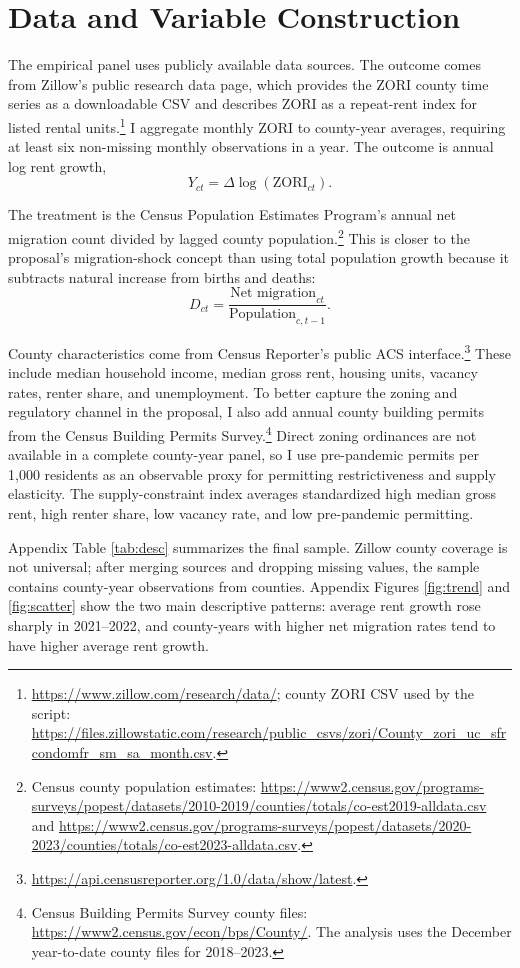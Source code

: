 \documentclass[11pt]{article}
\begin{document}
\section{Data and Variable Construction}

The empirical panel uses publicly available data sources. The outcome comes from Zillow's public research data page, which provides the ZORI county time series as a downloadable CSV and describes ZORI as a repeat-rent index for listed rental units.\footnote{\url{https://www.zillow.com/research/data/}; county ZORI CSV used by the script: \url{https://files.zillowstatic.com/research/public_csvs/zori/County_zori_uc_sfrcondomfr_sm_sa_month.csv}.} I aggregate monthly ZORI to county-year averages, requiring at least six non-missing monthly observations in a year. The outcome is annual log rent growth,
\[
Y_{ct}=\Delta \log(\text{ZORI}_{ct}).
\]

The treatment is the Census Population Estimates Program's annual net migration count divided by lagged county population.\footnote{Census county population estimates: \url{https://www2.census.gov/programs-surveys/popest/datasets/2010-2019/counties/totals/co-est2019-alldata.csv} and \url{https://www2.census.gov/programs-surveys/popest/datasets/2020-2023/counties/totals/co-est2023-alldata.csv}.} This is closer to the proposal's migration-shock concept than using total population growth because it subtracts natural increase from births and deaths:
\[
D_{ct}=\frac{\text{Net migration}_{ct}}{\text{Population}_{c,t-1}}.
\]

County characteristics come from Census Reporter's public ACS interface.\footnote{\url{https://api.censusreporter.org/1.0/data/show/latest}.} These include median household income, median gross rent, housing units, vacancy rates, renter share, and unemployment. To better capture the zoning and regulatory channel in the proposal, I also add annual county building permits from the Census Building Permits Survey.\footnote{Census Building Permits Survey county files: \url{https://www2.census.gov/econ/bps/County/}. The analysis uses the December year-to-date county files for 2018--2023.} Direct zoning ordinances are not available in a complete county-year panel, so I use pre-pandemic permits per 1,000 residents as an observable proxy for permitting restrictiveness and supply elasticity. The supply-constraint index averages standardized high median gross rent, high renter share, low vacancy rate, and low pre-pandemic permitting.

Appendix Table \ref{tab:desc} summarizes the final sample. Zillow county coverage is not universal; after merging sources and dropping missing values, the sample contains \AnalysisN{} county-year observations from \AnalysisCounties{} counties. Appendix Figures \ref{fig:trend} and \ref{fig:scatter} show the two main descriptive patterns: average rent growth rose sharply in 2021--2022, and county-years with higher net migration rates tend to have higher average rent growth.
\end{document}
